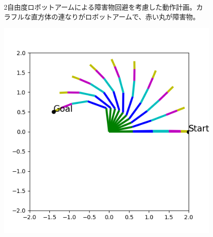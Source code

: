 \begin{figure}[htbp]
\begin{minipage}[!h]{0.32\columnwidth}
\begin{center}
    \end{center}
  \end{minipage}
  \caption{2自由度ロボットアームによる障害物回避を考慮した動作計画。カラフルな直方体の連なりがロボットアームで、赤い丸が障害物。}
  \label{figure:2dof}
\end{figure}

\vspace{-8mm}
\begin{figure}[htbp]
  \begin{minipage}[!h]{0.32\columnwidth}
    \begin{center}
      \includegraphics[width=1.0\columnwidth]{figs/5dof_without_obstacle}
    \end{center}
  \end{minipage}
  \begin{minipage}[!h]{0.32\columnwidth}
    \begin{center}

\end{center}
\end{minipage}
\end{figure}
